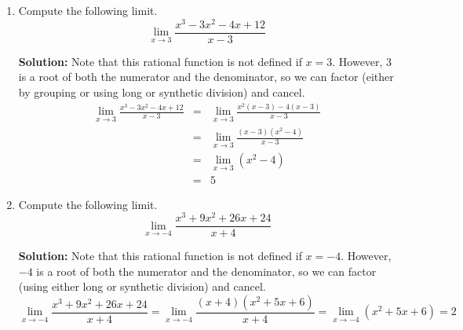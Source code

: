 \documentclass{article}
\begin{document}
\begin{enumerate}
  
\vspace{1cm}

\item Compute the following limit. \[ \lim_{x \rightarrow 3} \frac{x^3 - 3x^2 - 4x + 12}{x - 3} \]

\textbf{Solution:} Note that this rational function is not defined if $x = 3$. However, $3$ is a root of both the numerator and the denominator, so we can factor (either by grouping or using long or synthetic division) and cancel.
\begin{eqnarray*}
\lim_{x \rightarrow 3} \frac{x^3 - 3x^2 - 4x + 12}{x - 3} & = & \lim_{x \rightarrow 3} \frac{x^2(x - 3) - 4(x - 3)}{x - 3} \\
 & = & \lim_{x \rightarrow 3} \frac{(x - 3)(x^2 - 4)}{x - 3} \\
 & = & \lim_{x \rightarrow 3} (x^2 - 4) \\
 & = & 5
\end{eqnarray*}


  
\vspace{1cm}

\item Compute the following limit. \[ \lim_{x \rightarrow -4} \frac{x^3 + 9x^2 + 26x + 24}{x + 4} \]

\textbf{Solution:} Note that this rational function is not defined if $x = -4$. However, $-4$ is a root of both the numerator and the denominator, so we can factor (using either long or synthetic division) and cancel.
\[ \lim_{x \rightarrow -4} \frac{x^3 + 9x^2 + 26x + 24}{x + 4} = \lim_{x \rightarrow -4} \frac{(x + 4)(x^2 + 5x + 6)}{x + 4} = \lim_{x \rightarrow -4} (x^2 + 5x + 6) = 2 \]


  
\vspace{1cm}
\end{enumerate}
\end{document}
